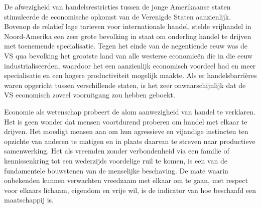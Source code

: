 De afwezigheid van handelsrestricties tussen de jonge Amerikaanse staten stimuleerde de economische opkomst van de Verenigde Staten aanzienlijk. Bovenop de relatief lage tarieven voor internationale handel, stelde vrijhandel in Noord-Amerika een zeer grote bevolking in staat om onderling handel te drijven met toenemende specialisatie. Tegen het einde van de negentiende eeuw was de VS qua bevolking het grootste land van alle westerse economieën die in die eeuw industrialiseerden, waardoor het een aanzienlijk economisch voordeel had en meer specialisatie en een hogere productiviteit mogelijk maakte. Als er handelsbarrières waren opgericht tussen verschillende staten, is het zeer onwaarschijnlijk dat de VS economisch zoveel vooruitgang zou hebben geboekt.

Economie als wetenschap probeert de alom aanwezigheid van handel te verklaren. Het is geen wonder dat mensen voortdurend proberen om handel met elkaar te drijven. Het moedigt mensen aan om hun agressieve en vijandige instincten ten opzichte van anderen te matigen en in plaats daarvan te streven naar productieve samenwerking. Het als vreemden zonder verbondenheid via een familie of kennissenkring tot een wederzijds voordelige ruil te komen, is een van de fundamentele bouwstenen van de menselijke beschaving. De mate waarin onbekenden kunnen verwachten vreedzaam met elkaar om te gaan, met respect voor elkaars lichaam, eigendom en vrije wil, is de indicator van hoe beschaafd een maatschappij is.
